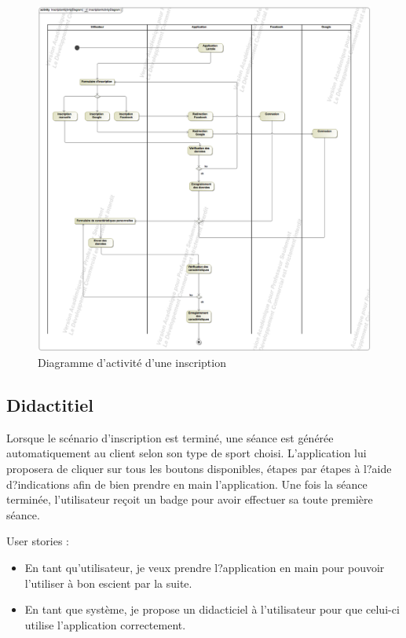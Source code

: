 \begin{figure}[!h]
\includegraphics[scale=0.3]{diagrams/inscription}
\centering
\caption{Diagramme d'activité d'une inscription}
\end{figure}

\subsection*{Didactitiel}

Lorsque le scénario d'inscription est terminé, une séance est générée automatiquement au client selon son type de sport choisi. L'application lui proposera de cliquer sur tous les boutons disponibles, étapes par étapes à l?aide d?indications afin de bien prendre en main l'application. Une fois la séance terminée, l'utilisateur reçoit un badge pour avoir effectuer sa toute première séance.\\


\begin{itshape}

User stories :

\begin{itemize}
\item En tant qu'utilisateur, je veux prendre l?application en main pour pouvoir l'utiliser à bon escient par la suite.
\item En tant que système, je propose un didacticiel à l'utilisateur pour que celui-ci utilise l'application correctement.
\end{itemize}

\end{itshape}

